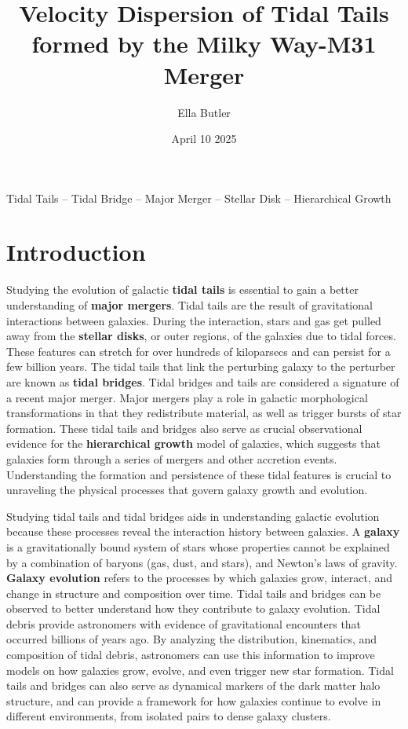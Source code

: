 \documentclass[fleqn,usenatbib]{mnras}
\title{Velocity Dispersion of Tidal Tails formed by the Milky Way-M31 Merger}
\author[]{Ella Butler}
\date{April 10 2025}
\begin{document}
\label{firstpage}
\pagerange{\pageref{firstpage}--\pageref{lastpage}}
\maketitle
\begin{keywords}
Tidal Tails -- Tidal Bridge -- Major Merger -- Stellar Disk -- Hierarchical Growth
\end{keywords}



\section{Introduction}

Studying the evolution of galactic \textbf{tidal tails} is essential to gain a better understanding of \textbf{major mergers}. Tidal tails are the result of gravitational interactions between galaxies. During the interaction, stars and gas get pulled away from the \textbf{stellar disks}, or outer regions, of the galaxies due to tidal forces. These features can stretch for over hundreds of kiloparsecs and can persist for a few billion years. The tidal tails that link the perturbing galaxy to the perturber are known as \textbf{tidal bridges}. Tidal bridges and tails are considered a signature of a recent major merger. Major mergers play a role in galactic morphological transformations in that they redistribute material, as well as trigger bursts of star formation. These tidal tails and bridges also serve as crucial observational evidence for the \textbf{hierarchical growth} model of galaxies, which suggests that galaxies form through a series of mergers and other accretion events. Understanding the formation and persistence of these tidal features is crucial to unraveling the physical processes that govern galaxy growth and evolution. 

Studying tidal tails and tidal bridges aids in understanding galactic evolution because these processes reveal the interaction history between galaxies. A \textbf{galaxy} is a gravitationally bound system of stars whose properties cannot be explained by a combination of baryons (gas, dust, and stars), and Newton's laws of gravity. \textbf{Galaxy evolution} refers to the processes by which galaxies grow, interact, and change in structure and composition over time. Tidal tails and bridges can be observed to better understand how they contribute to galaxy evolution. Tidal debris provide astronomers with evidence of gravitational encounters that occurred billions of years ago. By analyzing the distribution, kinematics, and composition of tidal debris, astronomers can use this information to improve models on how galaxies grow, evolve, and even trigger new star formation. Tidal tails and bridges can also serve as dynamical markers of the dark matter halo structure, and can provide a framework for how galaxies continue to evolve in different environments, from isolated pairs to dense galaxy clusters.
\end{document}
